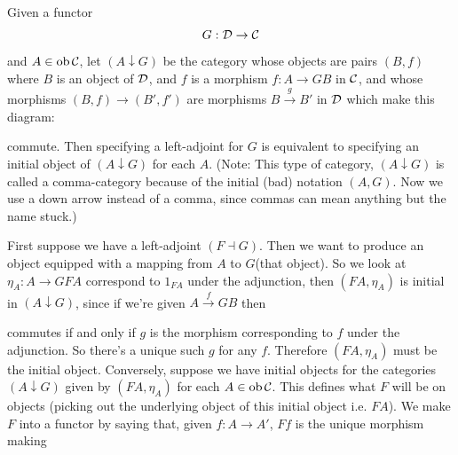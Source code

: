 \documentclass{article}
\begin{document}
\begin{fancythm}{}
    Given a functor \[ G : \mathcal{D} \to \mathcal{C}\] and $A \in \operatorname{ob} \mathcal{C}$, let $(A \downarrow G)$ be the category whose objects are pairs $(B,f)$ where $B$ is an object of $\mathcal{D}$, and $f$ is a morphism $f : A \to GB$ in $\mathcal{C}$, and whose morphisms $(B,f) \to (B',f')$ are morphisms $B \xrightarrow{g} B'$ in $\mathcal{D}$ which make this diagram:
    \begin{center}
    \end{center}
    commute. Then specifying a left-adjoint for $G$ is equivalent to specifying an initial object of $(A \downarrow G)$ for each $A$. (Note: This type of category, $(A \downarrow G)$ is called a comma-category because of the initial (bad) notation $(A,G)$. Now we use a down arrow instead of a comma, since commas can mean anything but the name stuck.)
\end{fancythm}
\proof First suppose we have a left-adjoint $(F \dashv G)$. Then we want to produce an object equipped with a mapping from $A$ to $G$(that object). So we look at $\eta_{A}: A \to GFA$ correspond to $1_{FA}$ under the adjunction, then $(FA,\eta_{A})$ is initial in $(A \downarrow G)$, since if we're given $A \xrightarrow{f} GB$ then \begin{center}
\end{center}
commutes if and only if $g$ is the morphism corresponding to $f$ under the adjunction. So there's a unique such $g$ for any $f$. Therefore $(FA,\eta_{A})$ must be the initial object. 
\gap Conversely, suppose we have initial objects for the categories $(A \downarrow G)$ given by $(FA,\eta_{A})$ for each $A \in \operatorname{ob} \mathcal{C}$. This defines what $F$ will be on objects (picking out the underlying object of this initial object i.e. $FA$). We make $F$ into a functor by saying that, given $f: A \to A'$, $Ff$ is the unique morphism making \begin{center}
\end{center}
\end{document}
